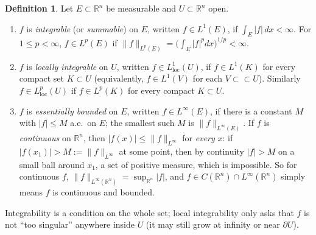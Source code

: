 \documentclass[11pt]{article}
\theoremstyle{plain}
\theoremstyle{definition}
\newtheorem{definition}[theorem]{Definition}
\theoremstyle{remark}
\begin{document}
\begin{definition}\label{def:Lp}
Let $E \subset \mathbb{R}^n$ be measurable and $U \subset \mathbb{R}^n$ open.
\begin{enumerate}
    \item $f$ is \emph{integrable} (or \emph{summable}) on $E$, written $f \in L^1(E)$, if $\int_E |f|\, dx < \infty$. For $1 \le p < \infty$, $f \in L^p(E)$ if $\|f\|_{L^p(E)} = \big(\int_E |f|^p dx\big)^{1/p} < \infty$.
    \item $f$ is \emph{locally integrable} on $U$, written $f \in L^1_{\mathrm{loc}}(U)$, if $f \in L^1(K)$ for every compact set $K \subset U$ (equivalently, $f \in L^1(V)$ for each $V \subset\subset U$). Similarly $f \in L^p_{\mathrm{loc}}(U)$ if $f \in L^p(K)$ for every compact $K \subset U$.
    \item $f$ is \emph{essentially bounded} on $E$, written $f \in L^\infty(E)$, if there is a constant $M$ with $|f| \le M$ a.e.\ on $E$; the smallest such $M$ is $\|f\|_{L^\infty(E)}$. If $f$ is \emph{continuous} on $\mathbb{R}^n$, then $|f(x)| \le \|f\|_{L^\infty}$ for \emph{every} $x$: if $|f(x_1)| > M := \|f\|_{L^\infty}$ at some point, then by continuity $|f| > M$ on a small ball around $x_1$, a set of positive measure, which is impossible. So for continuous $f$, $\|f\|_{L^\infty(\mathbb{R}^n)} = \sup_{\mathbb{R}^n}|f|$, and $f \in C(\mathbb{R}^n)\cap L^\infty(\mathbb{R}^n)$ simply means $f$ is continuous and bounded.
\end{enumerate}
Integrability is a condition on the whole set; local integrability only asks that $f$ is not ``too singular'' anywhere inside $U$ (it may still grow at infinity or near $\partial U$).
\end{definition}
\end{document}
